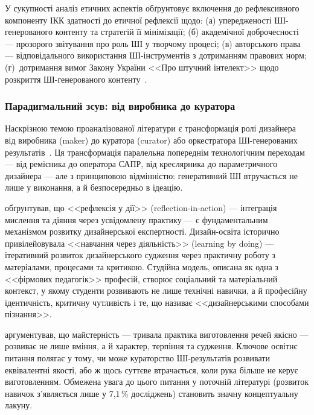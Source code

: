 У сукупності аналіз етичних аспектів обґрунтовує включення до рефлексивного компоненту ІКК здатності до етичної рефлексії щодо: (а) упередженості ШІ-генерованого контенту та стратегій її мінімізації; (б) академічної доброчесності --- прозорого звітування про роль ШІ у творчому процесі; (в) авторського права --- відповідального використання ШІ-інструментів з дотриманням правових норм; (г)~дотримання вимог Закону України <<Про штучний інтелект>> щодо розкриття ШІ-генерованого контенту~\cite{ZakonAI2025}.

\subsubsection{Парадигмальний зсув: від виробника до куратора}\label{sssec:1.2.10}

Наскрізною темою проаналізованої літератури є трансформація ролі дизайнера від виробника (maker) до куратора (curator) або оркестратора ШІ-генерованих результатів~\cite{Musiienko2026ScopingReview}. Ця трансформація паралельна попереднім технологічним переходам --- від ремісника до оператора САПР, від креслярника до параметричного дизайнера --- але з принциповою відмінністю: генеративний ШІ втручається не лише у виконання, а й безпосередньо в ідеацію.

\citet{Schon1983} обґрунтував, що <<рефлексія у дії>> (reflection-in-action) --- інтеграція мислення та діяння через усвідомлену практику --- є фундаментальним механізмом розвитку дизайнерської експертності. Дизайн-освіта історично привілейовувала <<навчання через діяльність>> (learning by doing) --- ітеративний розвиток дизайнерського судження через практичну роботу з матеріалами, процесами та критикою. Студійна модель, описана \citet{Shulman2005} як одна з <<фірмових педагогік>> професій, створює соціальний та матеріальний контекст, у якому студенти розвивають не лише технічні навички, а й професійну ідентичність, критичну чутливість і те, що \citet{Cross2011} називає <<дизайнерськими способами пізнання>>.

\citet{Sennett2008} аргументував, що майстерність --- тривала практика виготовлення речей якісно --- розвиває не лише вміння, а й характер, терпіння та судження. Ключове освітнє питання полягає у тому, чи може кураторство ШІ-результатів розвивати еквівалентні якості, або ж щось суттєве втрачається, коли рука більше не керує виготовленням. Обмежена увага до цього питання у поточній літературі (розвиток навичок з'являється лише у 7,1\,\% досліджень) становить значну концептуальну лакуну.

